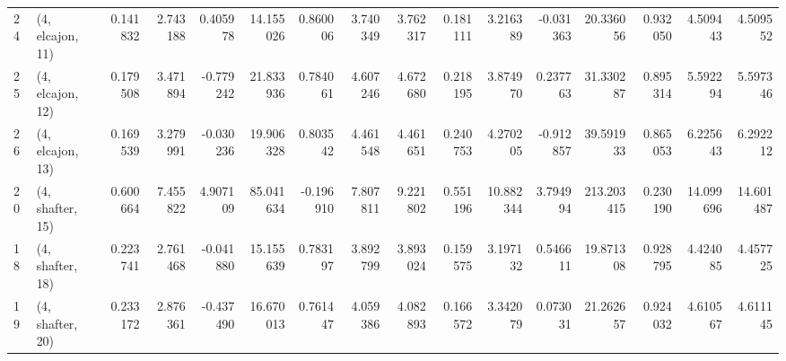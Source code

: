 \begin{tabular}{llrrrrrrrrrrrrrr}
24 &  (4, elcajon, 11) &   0.141832 &  2.743188 &  0.405978 &  14.155026 &  0.860006 &   3.740349 &  3.762317 &  0.181111 &   3.216389 & -0.031363 &   20.336056 &  0.932050 &   4.509443 &   4.509552 \\
25 &  (4, elcajon, 12) &   0.179508 &  3.471894 & -0.779242 &  21.833936 &  0.784061 &   4.607246 &  4.672680 &  0.218195 &   3.874970 &  0.237763 &   31.330287 &  0.895314 &   5.592294 &   5.597346 \\
26 &  (4, elcajon, 13) &   0.169539 &  3.279991 & -0.030236 &  19.906328 &  0.803542 &   4.461548 &  4.461651 &  0.240753 &   4.270205 & -0.912857 &   39.591933 &  0.865053 &   6.225643 &   6.292212 \\
20 &  (4, shafter, 15) &   0.600664 &  7.455822 &  4.907109 &  85.041634 & -0.196910 &   7.807811 &  9.221802 &  0.551196 &  10.882344 &  3.794994 &  213.203415 &  0.230190 &  14.099696 &  14.601487 \\
18 &  (4, shafter, 18) &   0.223741 &  2.761468 & -0.041880 &  15.155639 &  0.783197 &   3.892799 &  3.893024 &  0.159575 &   3.197132 &  0.546611 &   19.871308 &  0.928795 &   4.424085 &   4.457725 \\
19 &  (4, shafter, 20) &   0.233172 &  2.876361 & -0.437490 &  16.670013 &  0.761447 &   4.059386 &  4.082893 &  0.166572 &   3.342079 &  0.073031 &   21.262657 &  0.924032 &   4.610567 &   4.611145 \\
\bottomrule
\end{tabular}
